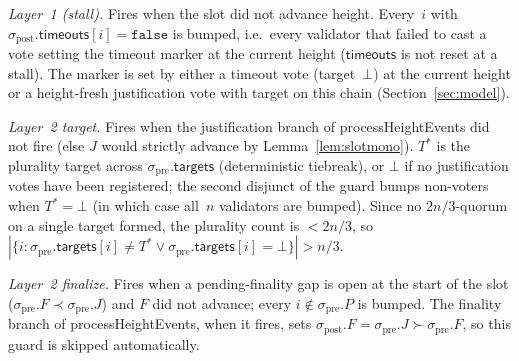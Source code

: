 \ifx\litemode\undefined\documentclass{article}\fi
\newcommand{\targets}{\mathsf{targets}}
\newcommand{\timeouts}{\mathsf{timeouts}}
\newcommand{\processHeightEvents}{\textsf{processHeightEvents}\xspace}
\theoremstyle{plain}
\theoremstyle{definition}
\theoremstyle{remark}
\begin{document}
\emph{Layer~1 (stall).} Fires when the slot did not advance height.
Every~$i$ with $\sigma_{\mathrm{post}}.\timeouts[i] = \mathtt{false}$ is bumped, i.e.\ every validator that failed to cast a vote setting the timeout marker at the current height ($\timeouts$ is not reset at a stall).
The marker is set by either a timeout vote (target~$\bot$) at the current height or a height-fresh justification vote with target on this chain (Section~\ref{sec:model}).

\emph{Layer~2 target.} Fires when the justification branch of \processHeightEvents did not fire (else $J$ would strictly advance by Lemma~\ref{lem:slotmono}).
$T^*$ is the plurality target across $\sigma_{\mathrm{pre}}.\targets$ (deterministic tiebreak), or $\bot$ if no justification votes have been registered; the second disjunct of the guard bumps non-voters when $T^* = \bot$ (in which case all~$n$ validators are bumped).
Since no $2n/3$-quorum on a single target formed, the plurality count is $< 2n/3$, so $|\{i : \sigma_{\mathrm{pre}}.\targets[i] \neq T^* \vee \sigma_{\mathrm{pre}}.\targets[i] = \bot\}| > n/3$.

\emph{Layer~2 finalize.} Fires when a pending-finality gap is open at the start of the slot ($\sigma_{\mathrm{pre}}.F \prec \sigma_{\mathrm{pre}}.J$) and $F$ did not advance; every $i \notin \sigma_{\mathrm{pre}}.P$ is bumped.
The finality branch of \processHeightEvents, when it fires, sets $\sigma_{\mathrm{post}}.F = \sigma_{\mathrm{pre}}.J \succ \sigma_{\mathrm{pre}}.F$, so this guard is skipped automatically.
\end{document}
